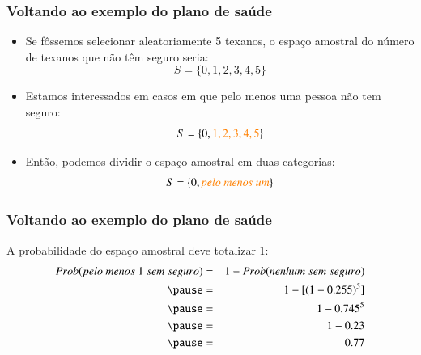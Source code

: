 
\begin{frame}
\frametitle{Voltando ao exemplo do plano de saúde}
\justifying
{}

\begin{itemize}
\justifying
\item Se fôssemos selecionar aleatoriamente 5 texanos, o espaço amostral do número de texanos que não têm seguro seria:
\[ S = \{0, 1, 2, 3, 4, 5\} \]
\justifying
\item Estamos interessados em casos em que pelo menos uma pessoa não tem seguro:
\[ S = \{0, \textit{\textcolor{orange}{$1, 2, 3, 4, 5$}} \} \]
\justifying
\item Então, podemos dividir o espaço amostral em duas categorias:
\[ S = \{0, \textit{\textcolor{orange}{pelo~menos~um}} \} \]

\end{itemize}

\end{frame}


\begin{frame}
\frametitle{Voltando ao exemplo do plano de saúde}
\justifying
A probabilidade do espaço amostral deve totalizar 1:
\begin{eqnarray*}
Prob (pelo~ menos ~ 1 ~ sem ~seguro) &=& 1 - Prob (nenhum ~ sem ~seguro) \\
\pause
&=& 1 - [(1-0.255)^5] \\
\pause
&=& 1- 0.745^5 \\
\pause
&=& 1 - 0.23 \\
\pause
&=& 0.77
\end{eqnarray*}

$\:$ \\
$\:$ \\
\justifying
{}

\end{frame}



